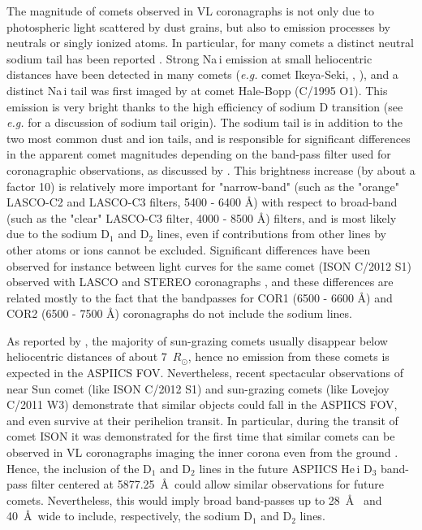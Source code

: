 \documentclass[namedreferences]{solarphysics}
\begin{document}
\begin{article}
The magnitude of comets observed in VL  coronagraphs is not only due to photospheric light scattered by dust grains, but also to emission processes by 
neutrals or singly ionized atoms. In particular, for many comets a distinct neutral sodium tail has been reported \cite{Bie02}. Strong Na\,{\sc i} 
emission at small heliocentric distances have been detected in many comets 
({\it e.g.} comet Ikeya-Seki, \citeauthor{Pre67} \citeyear{Pre67}, \citeauthor{Sla69} \citeyear{Sla69}), 
and a distinct Na\,{\sc i} tail was first imaged by  at comet Hale-Bopp (C/1995 O1). This emission is very bright thanks to the high 
efficiency of sodium D transition (see {\it e.g.} \citeauthor{Cre99} \citeyear{Cre99} for a discussion of sodium tail origin). 
The sodium tail is in addition to the two most common dust and ion tails, and is responsible for 
significant differences in the apparent comet magnitudes depending on the band-pass filter used for coronagraphic observations, as discussed by 
. 
This brightness increase (by about a factor 10) is relatively more important for "narrow-band" (such as the "orange" LASCO-C2 and LASCO-C3 filters, 
5400 - 6400 \AA) with respect to broad-band (such as the "clear" LASCO-C3 filter, 4000 - 8500 \AA) filters, and is most likely due to the sodium 
D$_{1}$ and D$_{2}$ lines, even if contributions from other lines by other atoms or ions cannot be excluded. Significant differences have been 
observed for instance between light curves for the same 
comet (ISON C/2012 S1) observed with LASCO and STEREO coronagraphs \cite{Kni14}, and these differences are related mostly to the fact that the bandpasses
for COR1 (6500 - 6600 \AA) and COR2 (6500 - 7500 \AA) coronagraphs do not include the sodium lines. 

As reported by , the majority of sun-grazing comets usually disappear below heliocentric distances of about 7~$R_{\odot}$, hence no 
emission from these comets is expected in the ASPIICS FOV. Nevertheless, recent spectacular observations of near Sun comet (like ISON C/2012 S1) and 
sun-grazing comets (like Lovejoy C/2011 W3) demonstrate that similar objects could fall in the ASPIICS FOV, and even survive at their perihelion transit. 
In particular, during the transit of comet ISON it was demonstrated for the first time that similar comets can be observed in VL coronagraphs imaging the 
inner corona even from the ground \cite{Dru14}. Hence, the inclusion of the D$_{1}$ and D$_{2}$ lines in the future ASPIICS He\,{\sc i} D$_{3}$ band-pass 
filter centered at 5877.25~\AA~could allow similar observations for future comets. Nevertheless, this would imply broad band-passes up to 28~\AA~ and 
40~\AA~wide to include, respectively, the sodium D$_{1}$ and D$_{2}$ lines.


\end{article}
\end{document}
